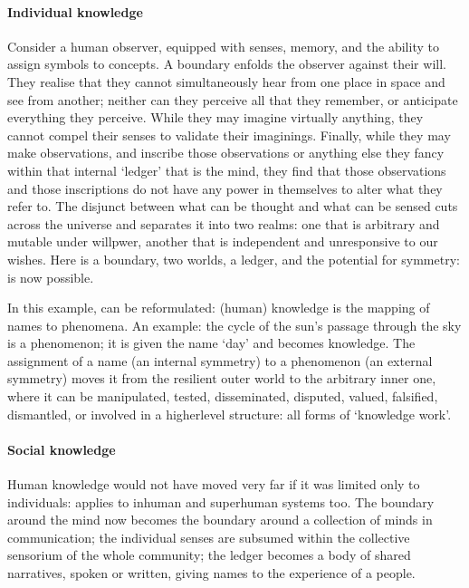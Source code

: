 \documentclass[letterpaper,10pt,english]{jupyterBook}
\begin{document}
\paragraph{Individual knowledge}
\label{\detokenize{content/chapter_03_everest/doctrine:individual-knowledge}}
\sphinxAtStartPar
Consider a human observer, equipped with senses, memory, and the ability to assign symbols to concepts. A boundary enfolds the observer against their will. They realise that they cannot simultaneously hear from one place in space and see from another; neither can they perceive all that they remember, or anticipate everything they perceive. While they may imagine virtually anything, they cannot compel their senses to validate their imaginings. Finally, while they may make observations, and inscribe those observations \sphinxhyphen{} or anything else they fancy \sphinxhyphen{} within that internal ‘ledger’ that is the mind, they find that those observations and those inscriptions do not have any power in themselves to alter what they refer to. The disjunct between what can be thought and what can be sensed cuts across the universe and separates it into two realms: one that is arbitrary and mutable under willpwer, another that is independent and unresponsive to our wishes. Here is a boundary, two worlds, a ledger, and the potential for symmetry:  is now possible.

\sphinxAtStartPar
In this example,  can be reformulated: (human) knowledge is the mapping of names to phenomena. An example: the cycle of the sun’s passage through the sky is a phenomenon; it is given the name ‘day’ and becomes knowledge. The assignment of a name (an internal symmetry) to a phenomenon (an external symmetry) moves it from the resilient outer world to the arbitrary inner one, where it can be manipulated, tested, disseminated, disputed, valued, falsified, dismantled, or involved in a higher\sphinxhyphen{}level structure: all forms of ‘knowledge work’.


\paragraph{Social knowledge}
\label{\detokenize{content/chapter_03_everest/doctrine:social-knowledge}}
\sphinxAtStartPar
Human knowledge would not have moved very far if it was limited only to individuals:  applies to inhuman and superhuman systems too. The boundary around the mind now becomes the boundary around a collection of minds in communication; the individual senses are subsumed within the collective sensorium of the whole community; the ledger becomes a body of shared narratives, spoken or written, giving names to the experience of a people.
\end{document}

